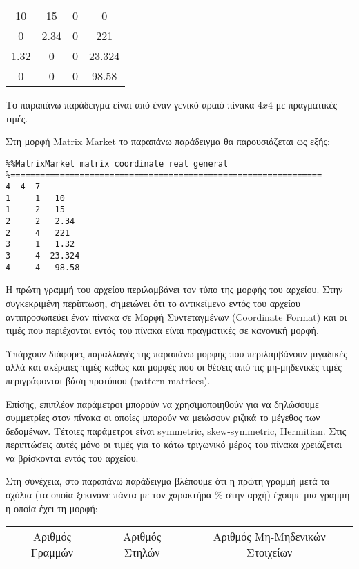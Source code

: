 \begin{center}
\begin{tabular}{ c c c c}
 10 & 15 & 0 & 0 \\ 
 0 & 2.34 & 0 & 221 \\  
 1.32 & 0 & 0 & 23.324 \\
 0 & 0 & 0 & 98.58
\end{tabular}
\end{center}

Το παραπάνω παράδειγμα είναι από έναν γενικό αραιό πίνακα $4x4$ με πραγματικές τιμές.

Στη μορφή \textlatin{Matrix Market} το παραπάνω παράδειγμα θα παρουσιάζεται ως εξής:
\begin{verbatim}
%%MatrixMarket matrix coordinate real general
%===============================================================
4  4  7
1     1   10
1     2   15
2     2   2.34
2     4   221
3     1   1.32
3     4  23.324
4     4   98.58
\end{verbatim}
Η πρώτη γραμμή του αρχείου περιλαμβάνει τον τύπο της μορφής του αρχείου. Στην συγκεκριμένη περίπτωση, σημειώνει ότι το αντικείμενο εντός του αρχείου αντιπροσωπεύει έναν πίνακα σε Μορφή Συντεταγμένων (\textlatin{Coordinate Format}) και οι τιμές που περιέχονται εντός του πίνακα είναι πραγματικές σε κανονική μορφή.

Υπάρχουν διάφορες παραλλαγές της παραπάνω μορφής που περιλαμβάνουν μιγαδικές αλλά και ακέραιες τιμές καθώς και μορφές που οι θέσεις από τις μη-μηδενικές τιμές περιγράφονται βάση προτύπου (\textlatin{pattern matrices}).

Επίσης, επιπλέον παράμετροι μπορούν να χρησιμοποιηθούν για να δηλώσουμε συμμετρίες στον πίνακα οι οποίες μπορούν να μειώσουν ριζικά το μέγεθος των δεδομένων. Τέτοιες παράμετροι είναι \textlatin{symmetric, skew-symmetric, Hermitian}. Στις περιπτώσεις αυτές μόνο οι τιμές για το κάτω τριγωνικό μέρος του πίνακα χρειάζεται να βρίσκονται εντός του αρχείου.

Στη συνέχεια, στο παραπάνω παράδειγμα βλέπουμε ότι η πρώτη γραμμή μετά τα σχόλια (τα οποία ξεκινάνε πάντα με τον χαρακτήρα \% στην αρχή) έχουμε μια γραμμή η οποία έχει τη μορφή:\\

\begin{center}
\begin{tabular}{ c c c }
 Αριθμός Γραμμών & Αριθμός Στηλών & Αριθμός Μη-Μηδενικών Στοιχείων
\end{tabular}
\end{center}

